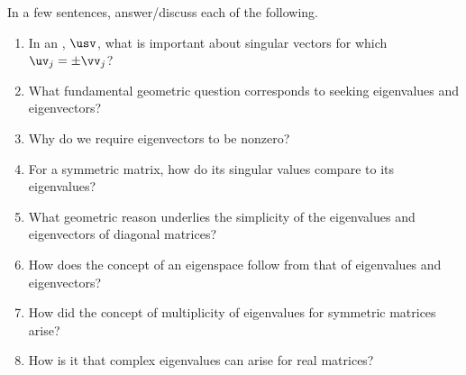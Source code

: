 \begin{exercise}  
In a few sentences, answer\slash discuss each of the following.
\begin{enumerate}
\item In an \svd, \(\usv\), what is important about singular vectors for which \(\uv_j=\pm \vv_j\)?

\item What fundamental geometric question corresponds to seeking eigenvalues and eigenvectors?

\item Why do we require eigenvectors to be nonzero?

\item For a symmetric matrix, how do its singular values compare to its eigenvalues?

\item What geometric reason underlies the simplicity of the eigenvalues and eigenvectors of diagonal matrices?

\item How does the concept of an eigenspace follow from that of eigenvalues and eigenvectors?

\item How did the concept of multiplicity of eigenvalues for symmetric matrices arise?

\item How is it that complex eigenvalues can arise for real matrices?

\end{enumerate}
\end{exercise}

\begin{comment}%
why, what caused X?
how did X occur?
what-if? what-if-not?
how does X compare with Y?
what is the evidence for X?
why is X important?
\end{comment}


